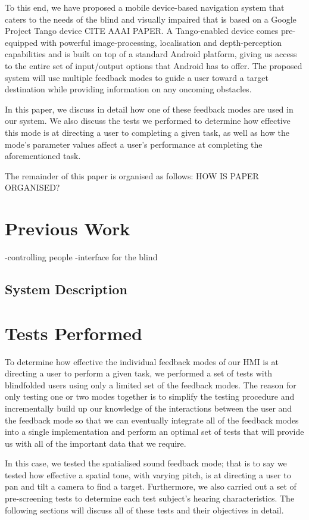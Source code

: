 \documentclass[format=sigconf, review=true, screen=true, anonymous=true]{acmart}
\begin{document}
To this end, we have proposed a mobile device-based navigation system that caters to the needs of the blind and visually impaired that is based on a Google Project Tango device {CITE AAAI PAPER}. A Tango-enabled device comes pre-equipped with powerful image-processing, localisation and depth-perception capabilities and is built on top of a standard Android platform, giving us access to the entire set of input/output options that Android has to offer. The proposed system will use multiple feedback modes to guide a user toward a target destination while providing information on any oncoming obstacles.

In this paper, we discuss in detail how one of these feedback modes are used in our system. We also discuss the tests we performed to determine how effective this mode is at directing a user to completing a given task, as well as how the mode's parameter values affect a user's performance at completing the aforementioned task. 

The remainder of this paper is organised as follows: HOW IS PAPER ORGANISED?

\section{Previous Work}

-controlling people
-interface for the blind

\subsection{System Description}

\section{Tests Performed}

To determine how effective the individual feedback modes of our HMI is at directing a user to perform a given task, we performed a set of tests with blindfolded users using only a limited set of the feedback modes. The reason for only testing one or two modes together is to simplify the testing procedure and incrementally build up our knowledge of the interactions between the user and the feedback mode so that we can eventually integrate all of the feedback modes into a single implementation and perform an optimal set of tests that will provide us with all of the important data that we require. 

In this case, we tested the spatialised sound feedback mode; that is to say we tested how effective a spatial tone, with varying pitch, is at directing a user to pan and tilt a camera to find a target. Furthermore, we also carried out a set of pre-screening tests to determine each test subject's hearing characteristics. The following sections will discuss all of these tests and their objectives in detail. 
\end{document}
